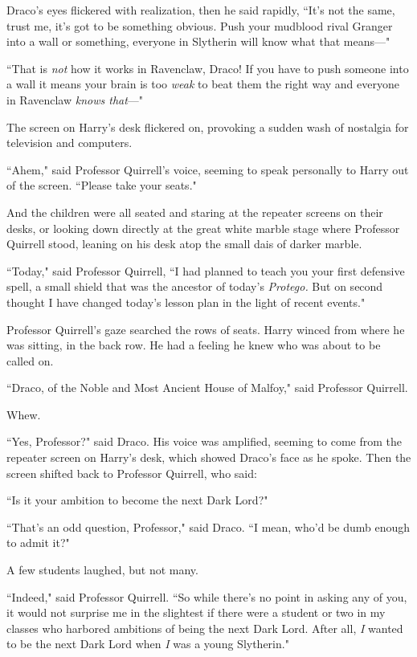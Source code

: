Draco's eyes flickered with realization, then he said rapidly, ``It's not the same, trust me, it's got to be something obvious. Push your mudblood rival Granger into a wall or something, everyone in Slytherin will know what that means—"

``That is \emph{not} how it works in Ravenclaw, Draco! If you have to push someone into a wall it means your brain is too \emph{weak} to beat them the right way and everyone in Ravenclaw \emph{knows that}—"

The screen on Harry's desk flickered on, provoking a sudden wash of nostalgia for television and computers.

``Ahem," said Professor Quirrell's voice, seeming to speak personally to Harry out of the screen. ``Please take your seats."

\later

And the children were all seated and staring at the repeater screens on their desks, or looking down directly at the great white marble stage where Professor Quirrell stood, leaning on his desk atop the small dais of darker marble.

``Today," said Professor Quirrell, ``I had planned to teach you your first defensive spell, a small shield that was the ancestor of today's \emph{Protego.} But on second thought I have changed today's lesson plan in the light of recent events."

Professor Quirrell's gaze searched the rows of seats. Harry winced from where he was sitting, in the back row. He had a feeling he knew who was about to be called on.

``Draco, of the Noble and Most Ancient House of Malfoy," said Professor Quirrell.

Whew.

``Yes, Professor?" said Draco. His voice was amplified, seeming to come from the repeater screen on Harry's desk, which showed Draco's face as he spoke. Then the screen shifted back to Professor Quirrell, who said:

``Is it your ambition to become the next Dark Lord?"

``That's an odd question, Professor," said Draco. ``I mean, who'd be dumb enough to admit it?"

A few students laughed, but not many.

``Indeed," said Professor Quirrell. ``So while there's no point in asking any of you, it would not surprise me in the slightest if there were a student or two in my classes who harbored ambitions of being the next Dark Lord. After all, \emph{I} wanted to be the next Dark Lord when \emph{I} was a young Slytherin."


